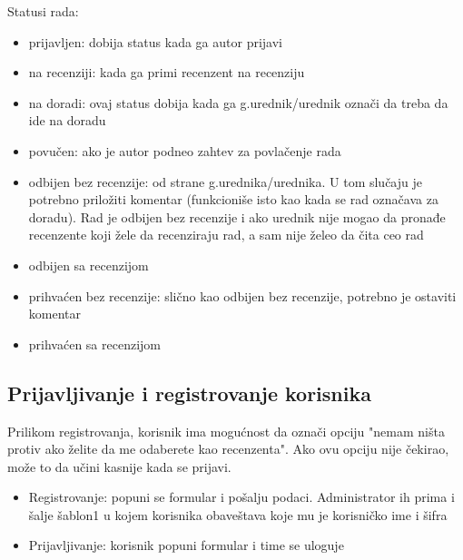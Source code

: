\documentclass[a4paper]{article}
\begin{document}
    Statusi rada:
    \begin{itemize}
        \item prijavljen: dobija status kada ga autor prijavi
        \item na recenziji: kada ga primi recenzent na recenziju
        \item na doradi: ovaj status dobija kada ga g.urednik/urednik označi da treba da ide na doradu
        \item povučen: ako je autor podneo zahtev za povlačenje rada
        \item odbijen bez recenzije: od strane g.urednika/urednika. U tom slučaju je potrebno priložiti komentar (funkcioniše isto kao kada se rad označava za doradu). Rad je odbijen bez recenzije i ako urednik nije mogao da pronađe recenzente koji žele da recenziraju rad, a sam nije želeo da čita ceo rad
        \item odbijen sa recenzijom
        \item prihvaćen bez recenzije: slično kao odbijen bez recenzije, potrebno je ostaviti komentar
        \item prihvaćen sa recenzijom
    \end{itemize}
    
    
\subsection{Prijavljivanje i registrovanje korisnika}
Prilikom registrovanja, korisnik ima mogućnost da označi opciju "nemam ništa protiv ako želite da me odaberete kao recenzenta". Ako ovu opciju nije čekirao, može to da učini kasnije kada se prijavi.
\begin{itemize}
    \item Registrovanje: popuni se formular i pošalju podaci. Administrator ih prima i šalje šablon1 u kojem korisnika obaveštava koje mu je korisničko ime i šifra
    \item Prijavljivanje: korisnik popuni formular i time se uloguje
\end{itemize}
    
\end{document}
